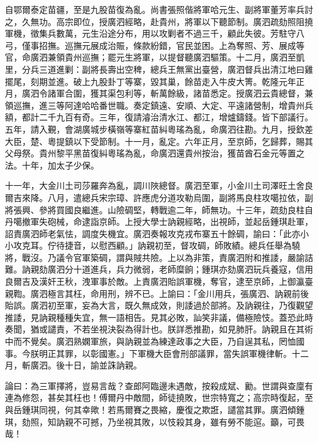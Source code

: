 \begin{pinyinscope}
自鄂爾泰定苗疆，至是九股苗復為亂。尚書張照偕將軍哈元生、副將軍董芳率兵討之，久無功。高宗即位，授廣泗經略，赴貴州，將軍以下聽節制。廣泗疏劾照阻撓軍機，徵集兵數萬，元生沿途分布，用以攻剿者不過三千，顧此失彼。芳駐守八弓，僅事招撫。巡撫元展成治賑，條款紛錯，官民並困。上為奪照、芳、展成等官，命廣泗兼領貴州巡撫；罷元生將軍，以提督聽廣泗驅策。十二月，廣泗至凱里，分兵三道進剿：副將長壽出空稗，總兵王無黨出臺營，廣泗督兵出清江地曰雞擺尾，刻期並進。破上九股卦丁等寨，毀其巢，餘苗走入牛皮大箐。乾隆元年正月，廣泗令諸軍合圍，獲其渠包利等，斬萬餘級，諸苗悉定。授廣泗云貴總督，兼領巡撫，進三等阿達哈哈番世職。奏定鎮遠、安順、大定、平遠諸營制，增貴州兵額，都計二千九百有奇。三年，復請濬治清水江、都江，增爐鑄錢。皆下部議行。五年，請入覲，會湖廣城步橫嶺等寨紅苗糾粵瑤為亂，命廣泗往勘。九月，授欽差大臣，楚、粵提鎮以下受節制。十一月，亂定。六年正月，至京師，乞歸葬，賜其父母祭。貴州黎平黑苗復糾粵瑤為亂，命廣泗還貴州按治，獲苗酋石金元等置之法。十年，加太子少保。

十一年，大金川土司莎羅奔為亂，調川陜總督。廣泗至軍，小金川土司澤旺土舍良爾吉來降。八月，遣總兵宋宗璋、許應虎分道攻勒烏圍，副將馬良柱攻噶拉依，副將張興、參將買國良繼進。山險碉堅，轉戰逾二年，師無功。十三年，疏劾良柱自丹噶撤軍失砲械，命逮詣京師。上授大學士訥親經略，出視師，並起岳鍾琪赴軍，詔責廣泗師老氣怯，調度失機宜。廣泗奏報攻克戎布寨五十餘碉，諭曰：「此亦小小攻克耳。佇待捷音，以慰西顧。」訥親初至，督攻碉，師敗績。總兵任舉為驍將，戰沒。乃議令官軍築碉，謂與賊共險。上以為非策，責廣泗附和推諉，嚴諭詰難。訥親劾廣泗分十道進兵，兵力微弱，老師糜餉；鍾琪亦劾廣泗玩兵養寇，信用良爾吉及漢奸王秋，洩軍事於敵。上責廣泗貽誤軍機，奪官，逮至京師，上御瀛臺親鞫。廣泗極言其枉，命用刑，辨不已。上諭曰：「金川用兵，張廣泗、訥親前後貽誤。廣泗初至軍，妄為大言，既久無成效，則諉過於部將。及訥親往，乃復觀望推諉，見訥親種種失宜，無一語相告。見其必敗，訕笑非議，備極險忮。蓋恐此時奏聞，猶或譴責，不若坐視決裂為得計也。朕詳悉推勘，如見肺肝。訥親且在其術中而不覺矣。廣泗熟嫻軍旅，與訥親並為練達政事之大臣，乃自逞其私，罔恤國事。今朕明正其罪，以彰國憲。」下軍機大臣會刑部議罪，當失誤軍機律斬。十二月，斬廣泗。後十日，諭並誅訥親。

論曰：為三軍擇將，豈易言哉？查郎阿臨邊未遇敵，按殺成斌、勷。世謂與查廩有連為修怨，甚矣其枉也！傅爾丹中敵間，師徒撓敗，世宗特寬之；高宗時復起，至與岳鍾琪同視，何其幸歟！若馬爾賽之畏縮，慶復之欺誑，譴當其罪。廣泗傾鍾琪，劾照，知訥親不可撼，乃坐視其敗，以忮殺其身，雖有勞不能逭。籲，可畏哉！


\end{pinyinscope}